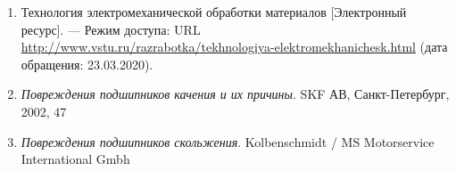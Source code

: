 \begin{enumerate}
\item 
Технология электромеханической обработки материалов [Электронный ресурс]. — Режим доступа: URL \url{http://www.vstu.ru/razrabotka/tekhnologiya-elektromekhanichesk.html} (дата обращения: 23.03.2020).

%
%
%
%
%
%
%
\item
\emph{Повреждения подшипников качения и их причины}. SKF АВ, Санкт-Петербург, 2002, 47
\item 	
\emph{Повреждения подшипников скольжения}. Kolbenschmidt / MS Motorservice International Gmbh
%

\end{enumerate}
